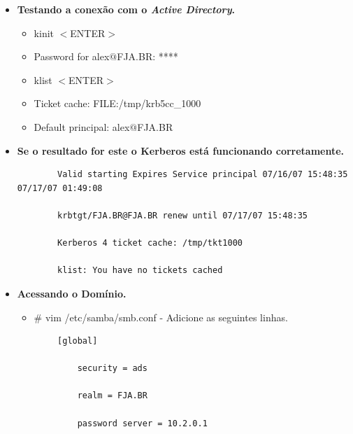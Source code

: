\begin{enumerate}
\begin{itemize}
\begin{lstlisting}
		[realms]

    	FJA.BR = \{

      	kdc = fjadc01.fja.br

      	default\_domain = FJA.BR

      	kpasswd\_server = fjadc01.fja.br

      	admin\_server = fjadc01.fja.br

     	\}

		[domain\_realm]

		.fja.br = FJA.BR
		\end{lstlisting}

	\item \textbf {Testando a conexão com o \textit{Active Directory}.}
		\begin{itemize}
			\item {kinit $<$ENTER$>$}
			\item {Password for alex$@$FJA.BR: ****}
			\item {klist $<$ENTER$>$}
			\item {Ticket cache: FILE:/tmp/krb5cc\_1000}
			\item {Default principal: alex$@$FJA.BR}
		\end{itemize}

	\item \textbf {Se o resultado for este o Kerberos está funcionando corretamente.}

		\begin{lstlisting}
		Valid starting Expires Service principal 07/16/07 15:48:35  07/17/07 01:49:08  

		krbtgt/FJA.BR@FJA.BR renew until 07/17/07 15:48:35
	
		Kerberos 4 ticket cache: /tmp/tkt1000
	
		klist: You have no tickets cached
		\end{lstlisting}

	\item \textbf{Acessando o Domínio.}
		\begin{itemize}
			\item {\# vim /etc/samba/smb.conf} -  Adicione as seguintes linhas.
		\end{itemize}

		\begin{lstlisting}
		[global]

        	security = ads
		
        	realm = FJA.BR

        	password server = 10.2.0.1


\end{lstlisting}
\end{itemize}
\end{enumerate}
